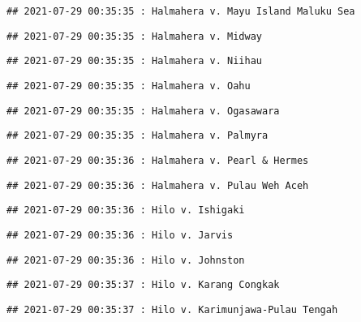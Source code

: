 \documentclass[
]{article}
\begin{document}
\begin{verbatim}
## 2021-07-29 00:35:35 : Halmahera v. Mayu Island Maluku Sea
\end{verbatim}

\begin{verbatim}
## 2021-07-29 00:35:35 : Halmahera v. Midway
\end{verbatim}

\begin{verbatim}
## 2021-07-29 00:35:35 : Halmahera v. Niihau
\end{verbatim}

\begin{verbatim}
## 2021-07-29 00:35:35 : Halmahera v. Oahu
\end{verbatim}

\begin{verbatim}
## 2021-07-29 00:35:35 : Halmahera v. Ogasawara
\end{verbatim}

\begin{verbatim}
## 2021-07-29 00:35:35 : Halmahera v. Palmyra
\end{verbatim}

\begin{verbatim}
## 2021-07-29 00:35:36 : Halmahera v. Pearl & Hermes
\end{verbatim}

\begin{verbatim}
## 2021-07-29 00:35:36 : Halmahera v. Pulau Weh Aceh
\end{verbatim}

\begin{verbatim}
## 2021-07-29 00:35:36 : Hilo v. Ishigaki
\end{verbatim}

\begin{verbatim}
## 2021-07-29 00:35:36 : Hilo v. Jarvis
\end{verbatim}

\begin{verbatim}
## 2021-07-29 00:35:36 : Hilo v. Johnston
\end{verbatim}

\begin{verbatim}
## 2021-07-29 00:35:37 : Hilo v. Karang Congkak
\end{verbatim}

\begin{verbatim}
## 2021-07-29 00:35:37 : Hilo v. Karimunjawa-Pulau Tengah
\end{verbatim}
\end{document}

